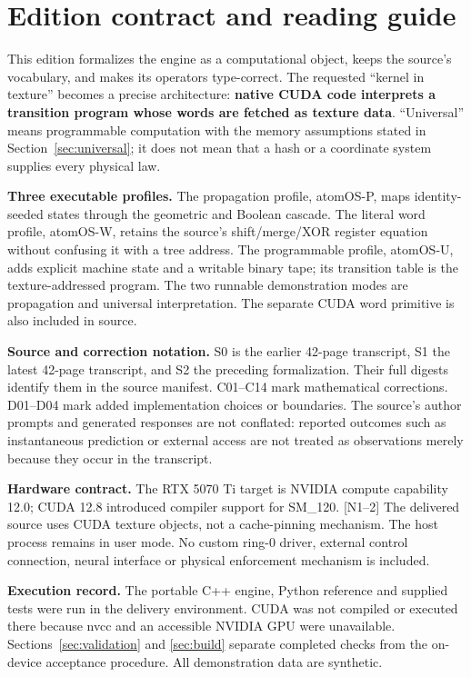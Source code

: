 \documentclass[11pt,a4paper]{article}
\newcommand{\ext}[1]{\textcolor{muted}{[N#1]}}
\begin{document}
\section*{Edition contract and reading guide}
This edition formalizes the engine as a computational object, keeps the source's vocabulary, and makes its operators type-correct. The requested ``kernel in texture'' becomes a precise architecture: \textbf{native CUDA code interprets a transition program whose words are fetched as texture data}. ``Universal'' means programmable computation with the memory assumptions stated in Section~\ref{sec:universal}; it does not mean that a hash or a coordinate system supplies every physical law.

\textbf{Three executable profiles.} The propagation profile, atomOS-P, maps identity-seeded states through the geometric and Boolean cascade. The literal word profile, atomOS-W, retains the source's shift/merge/XOR register equation without confusing it with a tree address. The programmable profile, atomOS-U, adds explicit machine state and a writable binary tape; its transition table is the texture-addressed program. The two runnable demonstration modes are propagation and universal interpretation. The separate CUDA word primitive is also included in source.

\textbf{Source and correction notation.} S0 is the earlier 42-page transcript, S1 the latest 42-page transcript, and S2 the preceding formalization. Their full digests identify them in the source manifest. C01--C14 mark mathematical corrections. D01--D04 mark added implementation choices or boundaries. The source's author prompts and generated responses are not conflated: reported outcomes such as instantaneous prediction or external access are not treated as observations merely because they occur in the transcript.

\begin{contract}
\textbf{Hardware contract.} The RTX 5070 Ti target is NVIDIA compute capability 12.0; CUDA 12.8 introduced compiler support for SM\_120. \ext{1--2} The delivered source uses CUDA texture objects, not a cache-pinning mechanism. The host process remains in user mode. No custom ring-0 driver, external control connection, neural interface or physical enforcement mechanism is included.
\end{contract}

\textbf{Execution record.} The portable C++ engine, Python reference and supplied tests were run in the delivery environment. CUDA was not compiled or executed there because nvcc and an accessible NVIDIA GPU were unavailable. Sections~\ref{sec:validation} and \ref{sec:build} separate completed checks from the on-device acceptance procedure. All demonstration data are synthetic.
\end{document}
